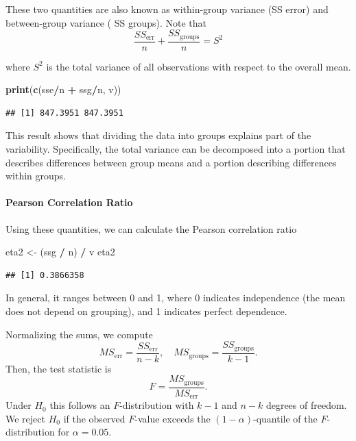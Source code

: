 \documentclass[
]{article}
\newenvironment{Shaded}{\begin{snugshade}}{\end{snugshade}}
\newcommand{\FunctionTok}[1]{\textcolor[rgb]{0.13,0.29,0.53}{\textbf{#1}}}
\newcommand{\NormalTok}[1]{#1}
\newcommand{\OtherTok}[1]{\textcolor[rgb]{0.56,0.35,0.01}{#1}}
\newcommand{\SpecialCharTok}[1]{\textcolor[rgb]{0.81,0.36,0.00}{\textbf{#1}}}
\begin{document}
These two quantities are also known as within-group variance (SS error)
and between-group variance ( SS groups). Note that \[
  \frac{SS_{\text{err}}}{n} + \frac{SS_{\text{groups}}}{n} = S^2
  \]

where \(S^2\) is the total variance of all observations with respect to
the overall mean.

\begin{Shaded}
\begin{Highlighting}[]
\FunctionTok{print}\NormalTok{(}\FunctionTok{c}\NormalTok{(sse}\SpecialCharTok{/}\NormalTok{n }\SpecialCharTok{+}\NormalTok{ ssg}\SpecialCharTok{/}\NormalTok{n, v))}
\end{Highlighting}
\end{Shaded}

\begin{verbatim}
## [1] 847.3951 847.3951
\end{verbatim}

This result shows that dividing the data into groups explains part of
the variability. Specifically, the total variance can be decomposed into
a portion that describes differences between group means and a portion
describing differences within groups.

\hypertarget{pearson-correlation-ratio}{%
\paragraph{Pearson Correlation Ratio}\label{pearson-correlation-ratio}}

Using these quantities, we can calculate the Pearson correlation ratio

\begin{Shaded}
\begin{Highlighting}[]
\NormalTok{eta2 }\OtherTok{\textless{}{-}}\NormalTok{ (ssg }\SpecialCharTok{/}\NormalTok{ n) }\SpecialCharTok{/}\NormalTok{ v}
\NormalTok{eta2}
\end{Highlighting}
\end{Shaded}

\begin{verbatim}
## [1] 0.3866358
\end{verbatim}

In general, it ranges between 0 and 1, where 0 indicates independence
(the mean does not depend on grouping), and 1 indicates perfect
dependence.

Normalizing the sums, we compute \[
  MS_{\text{err}} = \frac{SS_{\text{err}}}{n - k}, \quad MS_{\text{groups}} = \frac{SS_{\text{groups}}}{k - 1}.
  \] Then, the test statistic is
\[F=\frac{MS_{\text{groups}}}{MS_{\text{err}}}.\] Under \(H_0\) this
follows an \(F\)-distribution with \(k-1\) and \(n-k\) degrees of
freedom. We reject \(H_0\) if the observed \(F\)-value exceeds the
\((1-\alpha)\)-quantile of the \(F\)-distribution for \(\alpha=0.05\).
\end{document}

